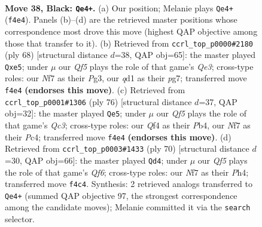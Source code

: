 \documentclass[11pt]{article}
\begin{document}
\clearpage

\begin{figure}[p]\centering
\begin{subfigure}{0.46\textwidth}\centering
\resizebox{\linewidth}{!}{%
\newchessgame
\chessboard[
  setfen={1k6/p1p2npp/1p2p3/2p3P1/5q1P/2P5/1P6/1K1Q4 b - - 0 38},
  showmover=false,
  pgfstyle=straightmove, color=movearrow, markmove={f4-e4}
]}
\caption{}
\end{subfigure}\hfill
\begin{subfigure}{0.46\textwidth}\centering
\resizebox{\linewidth}{!}{%
\newchessgame
\chessboard[
  setfen={6k1/p5p1/1p5p/1P2pp2/P1q5/4Q1P1/5P1P/6K1 w - - 0 35},
  showmover=false,
  pgfstyle=straightmove, color=movearrow, markmove={e3-e5}
]}
\caption{}
\end{subfigure}
\\[4pt]
\begin{subfigure}{0.46\textwidth}\centering
\resizebox{\linewidth}{!}{%
\newchessgame
\chessboard[
  setfen={6k1/3q2pp/p7/P1p5/1PP2p2/2Q1pP1P/6P1/7K w - - 0 39},
  showmover=false,
  pgfstyle=straightmove, color=movearrow, markmove={c3-e5}
]}
\caption{}
\end{subfigure}\hfill
\begin{subfigure}{0.46\textwidth}\centering
\resizebox{\linewidth}{!}{%
\newchessgame
\chessboard[
  setfen={6k1/5p2/2p2Qp1/p6p/4P2P/6P1/1P3P1K/2q5 w - - 6 36},
  showmover=false,
  pgfstyle=straightmove, color=movearrow, markmove={f6-d4}
]}
\caption{}
\end{subfigure}
\caption{\textbf{Move 38, Black: \texttt{Qe4+}.} (a) Our position; Melanie plays \texttt{Qe4+} (\texttt{f4e4}). Panels (b)--(d) are the retrieved master positions whose correspondence most drove this move (highest QAP objective among those that transfer to it). (b) Retrieved from \texttt{ccrl\_top\_p0000\#2180} (ply 68) [structural distance $d$=38, QAP obj=65]: the master played \texttt{Qxe5}; under $\mu$ our \emph{Qf5} plays the role of that game's \emph{Qe3}; cross-type roles: our \emph{N}f7 as their \emph{P}g3, our \emph{q}d1 as their \emph{p}g7; transferred move \texttt{f4e4} \textbf{(endorses this move)}. (c) Retrieved from \texttt{ccrl\_top\_p0001\#1306} (ply 76) [structural distance $d$=37, QAP obj=32]: the master played \texttt{Qe5}; under $\mu$ our \emph{Qf5} plays the role of that game's \emph{Qc3}; cross-type roles: our \emph{Q}f4 as their \emph{P}b4, our \emph{N}f7 as their \emph{P}c4; transferred move \texttt{f4e4} \textbf{(endorses this move)}. (d) Retrieved from \texttt{ccrl\_top\_p0003\#1433} (ply 70) [structural distance $d$=30, QAP obj=66]: the master played \texttt{Qd4}; under $\mu$ our \emph{Qf5} plays the role of that game's \emph{Qf6}; cross-type roles: our \emph{N}f7 as their \emph{P}h4; transferred move \texttt{f4c4}. Synthesis: 2 retrieved analogs transferred to \texttt{Qe4+} (summed QAP objective 97, the strongest correspondence among the candidate moves); Melanie committed it via the \texttt{search} selector.}
\label{fig:thought-m75}
\end{figure}
\end{document}

